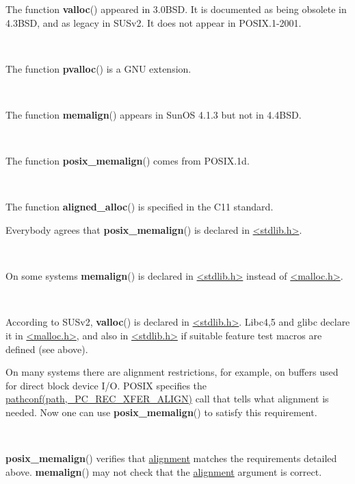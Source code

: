 \documentclass[]{article}
\let\realtextbf=\textbf
\renewcommand{\textbf}[1]{\textcolor{boldcolor}{\realtextbf{#1}}}
\renewcommand{\emph}[1]{\underline{#1}}
\begin{document}
The function \textbf{valloc}() appeared in 3.0BSD. It is documented as
being obsolete in 4.3BSD, and as legacy in SUSv2. It does not appear in
POSIX.1-2001.

~

The function \textbf{pvalloc}() is a GNU extension.

~

The function \textbf{memalign}() appears in SunOS 4.1.3 but not in
4.4BSD.

~

The function \textbf{posix\_memalign}() comes from POSIX.1d.

~

The function \textbf{aligned\_alloc}() is specified in the C11 standard.


Everybody agrees that \textbf{posix\_memalign}() is declared in
\emph{\textless{}stdlib.h\textgreater{}}.

~

On some systems \textbf{memalign}() is declared in
\emph{\textless{}stdlib.h\textgreater{}} instead of
\emph{\textless{}malloc.h\textgreater{}}.

~

According to SUSv2, \textbf{valloc}() is declared in
\emph{\textless{}stdlib.h\textgreater{}}. Libc4,5 and glibc declare it
in \emph{\textless{}malloc.h\textgreater{}}, and also in
\emph{\textless{}stdlib.h\textgreater{}} if suitable feature test macros
are defined (see above).


On many systems there are alignment restrictions, for example, on
buffers used for direct block device I/O. POSIX specifies the
\emph{pathconf(path,\_PC\_REC\_XFER\_ALIGN)} call that tells what
alignment is needed. Now one can use \textbf{posix\_memalign}() to
satisfy this requirement.

~

\textbf{posix\_memalign}() verifies that \emph{alignment} matches the
requirements detailed above. \textbf{memalign}() may not check that the
\emph{alignment} argument is correct.
\end{document}
